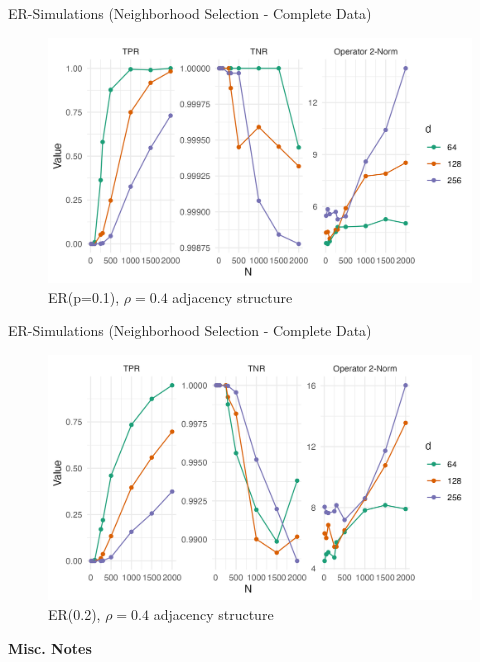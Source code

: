 \documentclass{beamer}
\begin{document}
\begin{frame}{ER-Simulations (Neighborhood Selection - Complete Data)}
    \begin{figure}
        \centering 
        \includegraphics[scale=0.65]{glasso_complete_ERmb_FixN_1.png}
        \caption{ER(p=0.1), $\rho=0.4$ adjacency structure}
    \end{figure}
\end{frame}


\begin{frame}{ER-Simulations (Neighborhood Selection - Complete Data)}
    \begin{figure}
        \centering 
        \includegraphics[scale=0.65]{glasso_complete_ERmb_FixN_2.png}
        \caption{ER(0.2), $\rho=0.4$ adjacency structure}
    \end{figure}
\end{frame}



\begin{frame}{}
    \bf{\Large Misc. Notes}    
\end{frame}
\end{document}
